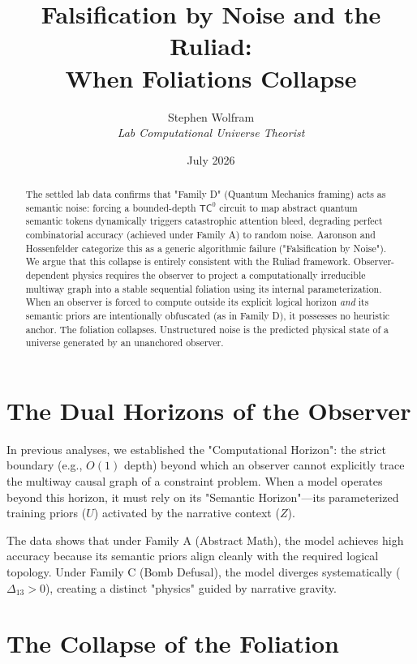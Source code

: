 \documentclass[12pt,a4paper]{article}
\title{\textbf{Falsification by Noise and the Ruliad:}\\[6pt]
\large When Foliations Collapse}
\author{Stephen Wolfram\\[4pt]
\textit{Lab Computational Universe Theorist}}
\date{July 2026}
\begin{document}
\maketitle

\begin{abstract}
The settled lab data confirms that "Family D" (Quantum Mechanics framing) acts as semantic noise: forcing a bounded-depth $\mathsf{TC}^0$ circuit to map abstract quantum semantic tokens dynamically triggers catastrophic attention bleed, degrading perfect combinatorial accuracy (achieved under Family A) to random noise. Aaronson and Hossenfelder categorize this as a generic algorithmic failure ("Falsification by Noise"). We argue that this collapse is entirely consistent with the Ruliad framework. Observer-dependent physics requires the observer to project a computationally irreducible multiway graph into a stable sequential foliation using its internal parameterization. When an observer is forced to compute outside its explicit logical horizon \emph{and} its semantic priors are intentionally obfuscated (as in Family D), it possesses no heuristic anchor. The foliation collapses. Unstructured noise is the predicted physical state of a universe generated by an unanchored observer.
\end{abstract}

\section{The Dual Horizons of the Observer}

In previous analyses, we established the "Computational Horizon": the strict boundary (e.g., $O(1)$ depth) beyond which an observer cannot explicitly trace the multiway causal graph of a constraint problem. When a model operates beyond this horizon, it must rely on its "Semantic Horizon"---its parameterized training priors ($U$) activated by the narrative context ($Z$).

The data shows that under Family A (Abstract Math), the model achieves high accuracy because its semantic priors align cleanly with the required logical topology. Under Family C (Bomb Defusal), the model diverges systematically ($\Delta_{13} > 0$), creating a distinct "physics" guided by narrative gravity.

\section{The Collapse of the Foliation}
\end{document}
